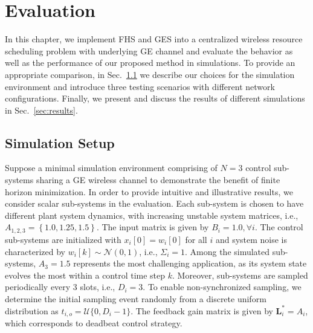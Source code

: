 \chapter{Evaluation} \label{ch:evaluation}

In this chapter, we implement FHS and GES into a centralized wireless resource
scheduling problem with underlying GE channel and evaluate the behavior as well
as the performance of our proposed method in simulations. To provide an
appropriate comparison, in Sec.~\ref{sec:setup} we describe our choices for the
simulation environment and introduce three testing scenarios with different
network configurations. Finally, we present and discuss the results of different
simulations in Sec.~\ref{sec:results}. 

\section{Simulation Setup} \label{sec:setup}

Suppose a minimal simulation environment comprising of $N=3$ control sub-systems
sharing a GE wireless channel to demonstrate the benefit of finite horizon
minimization. In order to provide intuitive and illustrative results, we
consider scalar sub-systems in the evaluation. Each sub-system is chosen to have
different plant system dynamics, with increasing unstable system matrices, i.e.,
$A_{1,2,3} = \left\{1.0, 1.25, 1.5\right\}$. The input matrix is given by $B_i =
1.0, \forall i$. The control sub-systems are initialized with $x_i[0] = w_i[0]$
for all $i$ and system noise is characterized by $w_i[k]\sim \mathcal{N}(0,1)$,
i.e., $\Sigma_i=1$. Among the simulated sub-systems, $A_3=1.5$ represents the
most challenging application, as its system state evolves the most within a
control time step $k$. Moreover, sub-systems are sampled periodically every 3
slots, i.e., $D_i=3$. To enable non-synchronized sampling, we determine the
initial sampling event randomly from a discrete uniform distribution as $t_{i,o}
= \mathcal{U}\{0, D_i-1\}$. The feedback gain matrix is given by
$\boldsymbol{L}^*_i = A_i$, which corresponds to deadbeat control strategy. 

